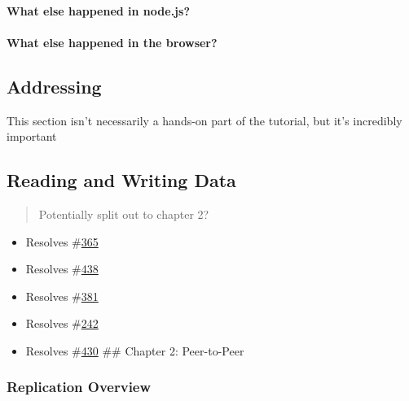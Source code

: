 \paragraph{What else happened in
node.js?}\label{what-else-happened-in-node.js-1}

\paragraph{What else happened in the
browser?}\label{what-else-happened-in-the-browser-1}

\subsection{Addressing}\label{addressing}

This section isn't necessarily a hands-on part of the tutorial, but it's
incredibly important

\subsection{Reading and Writing Data}\label{reading-and-writing-data}

\begin{quote}
Potentially split out to chapter 2?
\end{quote}

\begin{itemize}
\tightlist
\item
  Resolves \#\href{https://github.com/orbitdb/orbit-db/issues/365}{365}
\item
  Resolves \#\href{https://github.com/orbitdb/orbit-db/issues/438}{438}
\item
  Resolves \#\href{https://github.com/orbitdb/orbit-db/issues/381}{381}
\item
  Resolves \#\href{https://github.com/orbitdb/orbit-db/issues/242}{242}
\item
  Resolves \#\href{https://github.com/orbitdb/orbit-db/issues/430}{430}
  \#\# Chapter 2: Peer-to-Peer
\end{itemize}

\subsubsection{Replication Overview}\label{replication-overview}

